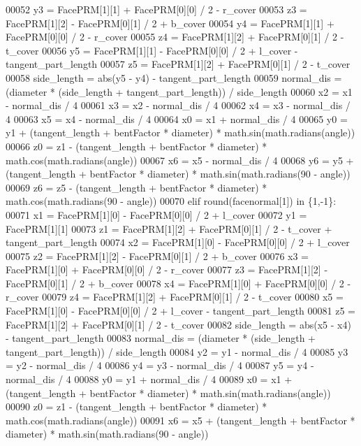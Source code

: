 \begin{DoxyCode}
00052         y3 = FacePRM[1][1] + FacePRM[0][0] / 2 - r\_cover
00053         z3 = FacePRM[1][2] - FacePRM[0][1] / 2 + b\_cover
00054         y4 = FacePRM[1][1] + FacePRM[0][0] / 2 - r\_cover
00055         z4 = FacePRM[1][2] + FacePRM[0][1] / 2 - t\_cover
00056         y5 = FacePRM[1][1] - FacePRM[0][0] / 2 + l\_cover - tangent\_part\_length
00057         z5 = FacePRM[1][2] + FacePRM[0][1] / 2 - t\_cover
00058         side\_length = abs(y5 - y4) - tangent\_part\_length
00059         normal\_dis = (diameter * (side\_length + tangent\_part\_length)) / side\_length
00060         x2 = x1 - normal\_dis / 4
00061         x3 = x2 - normal\_dis / 4
00062         x4 = x3 - normal\_dis / 4
00063         x5 = x4 - normal\_dis / 4
00064         x0 = x1 + normal\_dis / 4
00065         y0 = y1 + (tangent\_length + bentFactor * diameter) * math.sin(math.radians(angle))
00066         z0 = z1 - (tangent\_length + bentFactor * diameter) * math.cos(math.radians(angle))
00067         x6 = x5 - normal\_dis / 4
00068         y6 = y5 + (tangent\_length + bentFactor * diameter) * math.sin(math.radians(90 - angle))
00069         z6 = z5 - (tangent\_length + bentFactor * diameter) * math.cos(math.radians(90 - angle))
00070     \textcolor{keywordflow}{elif} round(facenormal[1]) \textcolor{keywordflow}{in} \{1,-1\}:
00071         x1 = FacePRM[1][0] - FacePRM[0][0] / 2 + l\_cover
00072         y1 = FacePRM[1][1]
00073         z1 = FacePRM[1][2] + FacePRM[0][1] / 2 - t\_cover + tangent\_part\_length
00074         x2 = FacePRM[1][0] - FacePRM[0][0] / 2 + l\_cover
00075         z2 = FacePRM[1][2] - FacePRM[0][1] / 2 + b\_cover
00076         x3 = FacePRM[1][0] + FacePRM[0][0] / 2 - r\_cover
00077         z3 = FacePRM[1][2] - FacePRM[0][1] / 2 + b\_cover
00078         x4 = FacePRM[1][0] + FacePRM[0][0] / 2 - r\_cover
00079         z4 = FacePRM[1][2] + FacePRM[0][1] / 2 - t\_cover
00080         x5 = FacePRM[1][0] - FacePRM[0][0] / 2 + l\_cover - tangent\_part\_length
00081         z5 = FacePRM[1][2] + FacePRM[0][1] / 2 - t\_cover
00082         side\_length = abs(x5 - x4) - tangent\_part\_length
00083         normal\_dis = (diameter * (side\_length + tangent\_part\_length)) / side\_length
00084         y2 = y1 - normal\_dis / 4
00085         y3 = y2 - normal\_dis / 4
00086         y4 = y3 - normal\_dis / 4
00087         y5 = y4 - normal\_dis / 4
00088         y0 = y1 + normal\_dis / 4
00089         x0 = x1 + (tangent\_length + bentFactor * diameter) * math.sin(math.radians(angle))
00090         z0 = z1 - (tangent\_length + bentFactor * diameter) * math.cos(math.radians(angle))
00091         x6 = x5 + (tangent\_length + bentFactor * diameter) * math.sin(math.radians(90 - angle))

\end{DoxyCode}
